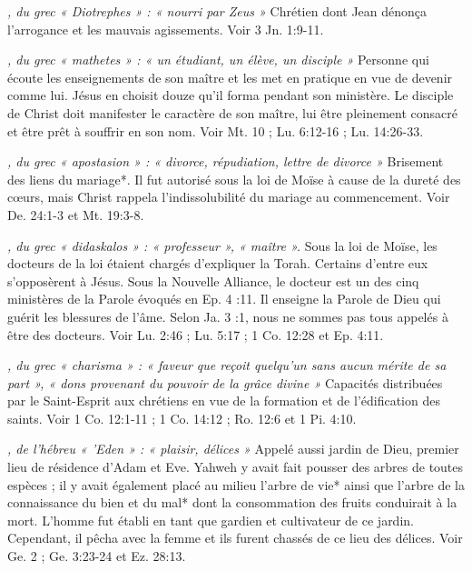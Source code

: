 \begin{multicols}{2}
\textit{, du grec « Diotrephes » : « nourri par Zeus »}\newline
Chrétien dont Jean dénonça l'arrogance et les mauvais agissements. Voir 3 Jn. 1:9-11.

\textit{, du grec « mathetes » : « un étudiant, un élève, un disciple »}\newline
Personne qui écoute les enseignements de son maître et les met en pratique en vue de devenir comme lui. Jésus en choisit douze qu'il forma pendant son ministère. Le disciple de Christ doit manifester le caractère de son maître, lui être pleinement consacré et être prêt à souffrir en son nom. Voir Mt. 10 ; Lu. 6:12-16 ; Lu. 14:26-33.

\textit{, du grec « apostasion » : « divorce, répudiation, lettre de divorce »}\newline
Brisement des liens du mariage*. Il fut autorisé sous la loi de Moïse à cause de la dureté des cœurs, mais Christ rappela l'indissolubilité du mariage au commencement. Voir De. 24:1-3 et Mt. 19:3-8.

\textit{, du grec « didaskalos » : « professeur », « maître ».}\newline
Sous la loi de Moïse, les docteurs de la loi étaient chargés d'expliquer la Torah. Certains d'entre eux s'opposèrent à Jésus. Sous la Nouvelle Alliance, le docteur est un des cinq ministères de la Parole évoqués en Ep. 4 :11. Il enseigne la Parole de Dieu qui guérit les blessures de l'âme. Selon Ja. 3 :1, nous ne sommes pas tous appelés à être des docteurs. Voir Lu. 2:46 ; Lu. 5:17 ; 1 Co. 12:28 et Ep. 4:11.

\textit{, du grec « charisma » : « faveur que reçoit quelqu'un sans aucun mérite de sa part », « dons provenant du pouvoir de la grâce divine »}\newline
Capacités distribuées par le Saint-Esprit aux chrétiens en vue de la formation et de l'édification des saints. Voir 1 Co. 12:1-11 ; 1 Co. 14:12 ; Ro. 12:6 et 1 Pi. 4:10.

\textit{, de l'hébreu « 'Eden » : « plaisir, délices »}\newline
Appelé aussi jardin de Dieu, premier lieu de résidence d'Adam et Eve. Yahweh y avait fait pousser des arbres de toutes espèces ; il y avait également placé au milieu l'arbre de vie* ainsi que l'arbre de la connaissance du bien et du mal* dont la consommation des fruits conduirait à la mort. L'homme fut établi en tant que gardien et cultivateur de ce jardin. Cependant, il pêcha avec la femme et ils furent chassés de ce lieu des délices. Voir Ge. 2 ; Ge. 3:23-24 et Ez. 28:13.


\end{multicols}
